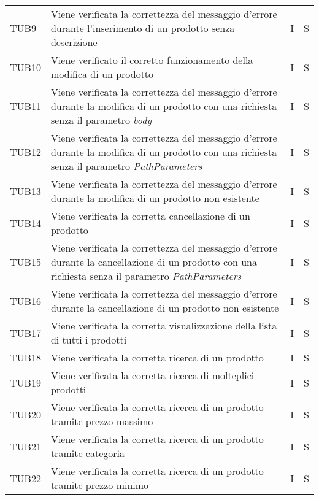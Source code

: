 {\begin{longtable}{C{2cm} C{9.6cm} C{1.5cm} C{1cm}}
TUB9 & Viene verificata la correttezza del messaggio d'errore durante l'inserimento di un prodotto senza descrizione & I & S\\

TUB10 & Viene verificato il corretto funzionamento della modifica di un prodotto & I & S\\

TUB11 & Viene verificata la correttezza del messaggio d'errore durante la modifica di un prodotto con una richiesta senza il parametro \textit{body} & I & S\\


TUB12 & Viene verificata la correttezza del messaggio d'errore durante la modifica di un prodotto con una richiesta senza il parametro \textit{PathParameters} & I & S\\

TUB13 & Viene verificata la correttezza del messaggio d'errore durante la modifica di un prodotto non esistente & I & S\\

TUB14 & Viene verificata la corretta cancellazione di un prodotto & I & S\\

TUB15 & Viene verificata la correttezza del messaggio d'errore durante la cancellazione di un prodotto con una richiesta senza il parametro \textit{PathParameters} & I & S\\

TUB16 & Viene verificata la correttezza del messaggio d'errore durante la cancellazione di un prodotto non esistente & I & S\\

TUB17 & Viene verificata la corretta visualizzazione della lista di tutti i prodotti & I & S\\

TUB18 & Viene verificata la corretta ricerca di un prodotto & I & S\\

TUB19 & Viene verificata la corretta ricerca di molteplici prodotti & I & S\\

TUB20 & Viene verificata la corretta ricerca di un prodotto tramite prezzo massimo & I & S\\

TUB21 & Viene verificata la corretta ricerca di un prodotto tramite categoria & I & S\\

TUB22 & Viene verificata la corretta ricerca di un prodotto tramite prezzo minimo & I & S\\


\end{longtable}}
